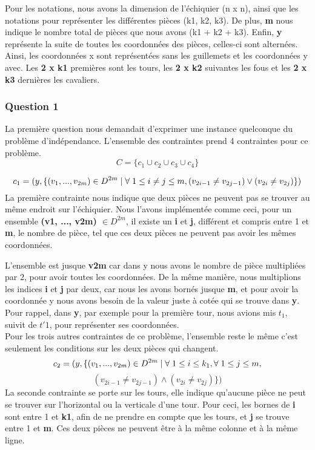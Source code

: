 \documentclass{article}
\begin{document}
Pour les notations, nous avons la dimension de l'échiquier (n x n), ainsi que les notations pour représenter les différentes pièces (k1, k2, k3). 
De plus, \textbf{m} nous indique le nombre total de pièces que nous avons (k1 + k2 + k3). 
Enfin, \textbf{y} représente la suite de toutes les coordonnées des pièces, celles-ci sont alternées. Ainsi, les coordonnées x sont représentées sans les guillemets et les coordonnées y avec. Les \textbf{2 x k1} premières sont les tours, les \textbf{2 x k2} suivantes les fous et les \textbf{2 x k3} dernières les cavaliers.

\subsubsection{Question 1}
La première question nous demandait d'exprimer une instance quelconque du problème d'indépendance. L'ensemble des contraintes prend 4 contraintes pour ce problème.
$$C = \{c_{1} \cup c_{2} \cup c_{3} \cup c_{4}\} $$

$$c_{1} = ( y, \{ (v_{1}, ..., v_{2m}) \in  D^{2m} \mid \forall \hspace{0.1cm}  1\leq i \neq j \leq m, (v_{2i-1} \neq v_{2j-1}) \vee  (v_{2i} \neq v_{2j}) \} ) $$
La première contrainte nous indique que deux pièces ne peuvent pas se trouver au même endroit sur l'échiquier. 
Nous l'avons implémentée comme ceci, pour un ensemble \textbf{(v1, ..., v2m) $\in D^{2m}$}, il existe un \textbf{i} et \textbf{j}, différent et compris entre 1 et \textbf{m}, le nombre de pièce, tel que ces deux pièces ne peuvent pas avoir les mêmes coordonnées. 

L'ensemble est jusque \textbf{v2m} car dans y nous avons le nombre de pièce multipliées par 2, pour avoir toutes les coordonnées. De la même manière, nous multiplions les indices \textbf{i} et \textbf{j} par deux, car nous les avons bornés jusque \textbf{m}, et pour avoir la coordonnée y nous avons besoin de la valeur juste à cotée qui se trouve dans \textbf{y}. Pour rappel, dans \textbf{y}, par exemple pour la première tour, nous avions mis $t_{1}$, suivit de $t'{1}$, pour représenter ses coordonnées.\\

Pour les trois autres contraintes de ce problème, l'ensemble reste le même c'est seulement les conditions sur les deux pièces qui changent. \\

$$ c_{2} = ( y, \{ (v_{1}, ..., v_{2m}) \in  D^{2m} \mid \forall \hspace{0.1cm} 1\leq i \leq k_{1}, \forall \hspace{0.1cm} 1\leq j \leq m,$$
$$ (v_{2i-1} \neq v_{2j-1}) \wedge  (v_{2i} \neq v_{2j}) \} ) $$
La seconde contrainte se porte sur les tours, elle indique qu'aucune pièce ne peut se trouver sur l'horizontal ou la verticale d'une tour. Pour ceci, les bornes de \textbf{i} sont entre 1 et \textbf{k1}, afin de ne prendre en compte que les tours, et \textbf{j} se trouve entre 1 et \textbf{m}.  Ces deux pièces ne peuvent être à la même colonne et à la même ligne. 
\end{document}
